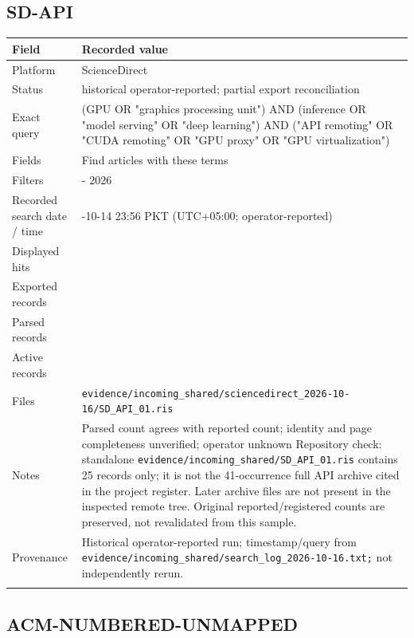 \subsection{SD-API}

\begin{longtable}{>{\raggedright\arraybackslash}p{}>{\raggedright\arraybackslash}p{}}
\toprule
\textbf{Field} & \textbf{Recorded value}\\\midrule\endhead
Platform & ScienceDirect\\\addlinespace
Status & historical operator-reported; partial export reconciliation\\\addlinespace
Exact query & (GPU OR "graphics processing unit") AND (inference OR "model serving" OR "deep learning") AND ("API remoting" OR "CUDA remoting" OR "GPU proxy" OR "GPU virtualization")\\\addlinespace
Fields & Find articles with these terms\\\addlinespace
Filters & 2020 - 2026\\\addlinespace
Recorded search date / time & 2026-10-14 23:56 PKT (UTC+05:00; operator-reported)\\\addlinespace
Displayed hits & 41\\\addlinespace
Exported records & 41\\\addlinespace
Parsed records & 41\\\addlinespace
Active records & 41\\\addlinespace
Files & \nolinkurl{evidence/incoming_shared/sciencedirect_2026-10-16/SD_API_01.ris}\\\addlinespace
Notes & Parsed count agrees with reported count; identity and page completeness unverified; operator unknown Repository check: standalone \nolinkurl{evidence/incoming_shared/SD_API_01.ris} contains 25 records only; it is not the 41-occurrence full API archive cited in the project register. Later archive files are not present in the inspected remote tree. Original reported/registered counts are preserved, not revalidated from this sample.\\\addlinespace
Provenance & Historical operator-reported run; timestamp/query from \nolinkurl{evidence/incoming_shared/search_log_2026-10-16.txt;} not independently rerun.\\\addlinespace
\bottomrule\end{longtable}

\subsection{ACM-NUMBERED-UNMAPPED}

